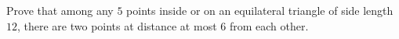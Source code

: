 Prove that among any $5$ points inside or on an equilateral triangle of side length $12$, there are two points at distance at most $6$ from each other.
